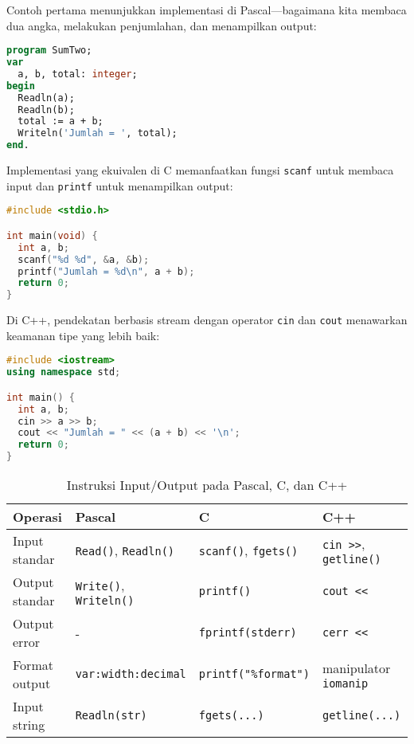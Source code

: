 \documentclass[../main.tex]{subfiles}
\begin{document}
Contoh pertama menunjukkan implementasi di Pascal—bagaimana kita membaca dua angka, melakukan penjumlahan, dan menampilkan output:

\begin{lstlisting}[language=Pascal, caption={Menjumlah dua bilangan pada Pascal}]
program SumTwo;
var
  a, b, total: integer;
begin
  Readln(a);
  Readln(b);
  total := a + b;
  Writeln('Jumlah = ', total);
end.
\end{lstlisting}

Implementasi yang ekuivalen di C memanfaatkan fungsi \texttt{scanf} untuk membaca input dan \texttt{printf} untuk menampilkan output:

\begin{lstlisting}[language=C, caption={Menjumlah dua bilangan pada C}]
#include <stdio.h>

int main(void) {
  int a, b;
  scanf("%d %d", &a, &b);
  printf("Jumlah = %d\n", a + b);
  return 0;
}
\end{lstlisting}

Di C++, pendekatan berbasis stream dengan operator \texttt{cin} dan \texttt{cout} menawarkan keamanan tipe yang lebih baik:

\begin{lstlisting}[language=C++, caption={Menjumlah dua bilangan pada C++}]
#include <iostream>
using namespace std;

int main() {
  int a, b;
  cin >> a >> b;
  cout << "Jumlah = " << (a + b) << '\n';
  return 0;
}
\end{lstlisting}

\begin{table}[H]
  \centering
  \small
  \caption{Instruksi Input/Output pada Pascal, C, dan C++}
  \begin{tabular}{@{}llll@{}}
    \toprule
    Operasi & Pascal & C & C++ \\
    \midrule
    Input standar & \texttt{Read()}, \texttt{Readln()} & \texttt{scanf()}, \texttt{fgets()} & \texttt{cin >>}, \texttt{getline()} \\
    Output standar & \texttt{Write()}, \texttt{Writeln()} & \texttt{printf()} & \texttt{cout <<} \\
    Output error & - & \texttt{fprintf(stderr)} & \texttt{cerr <<} \\
    Format output & \texttt{var:width:decimal} & \texttt{printf("\%format")} & manipulator \texttt{iomanip} \\
    Input string & \texttt{Readln(str)} & \texttt{fgets(...)} & \texttt{getline(...)} \\
    \bottomrule
  \end{tabular}
  \\\parencite{w3pascal-io,gnu-c-manual,cplusplus-io,cpp-iomanip}
\end{table}
\end{document}
